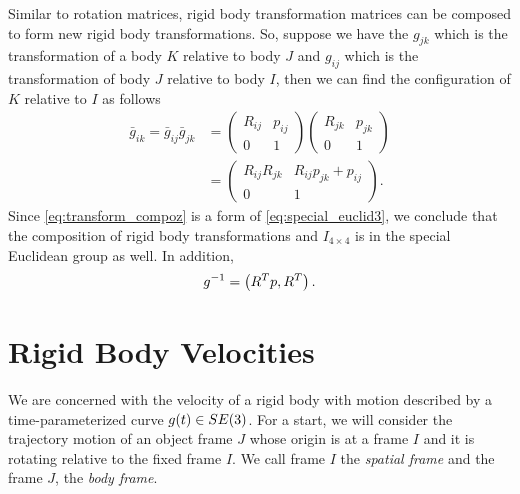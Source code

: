 Similar to rotation matrices, rigid body transformation matrices can be composed to form new rigid body transformations. So, suppose we have the $g_{jk}$ which is the transformation of a body $K$ relative to body $J$ and $g_{ij}$ which is the transformation of body $J$ relative to body $I$, then we can find the configuration of $K$ relative to $I$ as follows
%
\begin{align}
	\bar{g}_{ik} = \bar{g}_{ij} \bar{g}_{jk} 
	&= \left(\begin{array}{cc}
	R_{ij} & p_{ij} \\
	0 & 1
	\end{array}\right)
	\left(\begin{array}{cc}
	R_{jk} & p_{jk} \\
	0 & 1
	\end{array}\right) \\
	&= \left(\begin{array}{cc}
	R_{ij} R_{jk} & R_{ij} p_{jk} + p_{ij}\\
	0 & 1
	\end{array}\right).
	\label{eq:transform_compoz}
\end{align}
%
Since \eqref{eq:transform_compoz} is a form of \eqref{eq:special_euclid3}, we conclude that the composition of rigid body transformations and $I_{4\times 4}$ is in the special Euclidean group as well. In addition, 
%
\begin{align}
	g^{-1} = \left(R^Tp, R^T\right).
	\label{eq:compact_transform}
\end{align}

\section{Rigid Body Velocities}
%
We are concerned with the velocity of a rigid body with motion described by a time-parameterized curve $g(t) \in SE(3)$. For a start, we will consider the trajectory motion of an object frame $J$ whose origin is at a frame $I$ and it is rotating relative to the fixed frame $I$. We call frame $I$ the \textit{spatial frame} and the frame $J$, the \textit{body frame}. 

